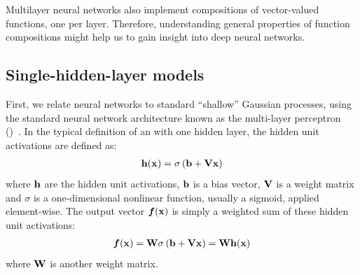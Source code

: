 Multilayer neural networks also implement compositions of vector-valued functions, one per layer.
Therefore, understanding general properties of function compositions might help us to gain insight into deep neural networks.


\subsection{Single-hidden-layer models}

First, we relate neural networks to standard ``shallow'' Gaussian processes, using the standard neural network architecture known as the multi-layer perceptron (\MLP{})~\citep{rosenblatt1962principles}.
In the typical definition of an \MLP{} with one hidden layer, the hidden unit activations are defined as:
%
\begin{align}
{\bf{h}}({\bf{x}}) = \sigma \left( {\bf{b}} + \mathbf{V} {\bf{x}} \right)
\end{align}
%
where ${\bf{h}}$ are the hidden unit activations, ${\bf{b}}$ is a bias vector, $\mathbf{V}$ is a weight matrix and $\sigma$ is a one-dimensional nonlinear function, usually a sigmoid, applied element-wise. The output vector $\boldsymbol{f}({\bf{x}})$ is simply a weighted sum of these hidden unit activations:
%
\begin{align}
\boldsymbol{f}({\bf{x}}) = \mathbf{W} \sigma \left( {\bf{b}} + \mathbf{V} {\bf{x}} \right)  = \mathbf{W} {\bf{h}}({\bf{x}})
\label{eq:one-layer-nn}
\end{align}
%
where $\mathbf{W}$ is another weight matrix.

